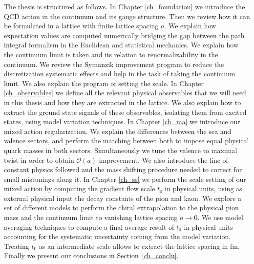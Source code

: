 The thesis is structured as follows. In Chapter \ref{ch_foundation} we introduce the QCD action in the continuum and its gauge structure. Then we review how it can be formulated in a lattice with finite lattice spacing $a$. We explain how expectation values are computed numerically bridging the gap between the path integral formalism in the Euclidean and statistical mechanics. We explain how the continuum limit is taken and its relation to renormalizability in the continuum. We review the Symanzik improvement program to reduce the discretization systematic effects and help in the task of taking the continuum limit. We also explain the program of setting the scale. In Chapter \ref{ch_observables} we define all the relevant physical observables that we will need in this thesis and how they are extracted in the lattice. We also explain how to extract the ground state signals of these observables, isolating them from excited states, using model variation techniques. In Chapter \ref{ch_ma} we introduce our mixed action regularization. We explain the differences between the sea and valence sectors, and perform the matching between both to impose equal physical quark masses in both sectors. Simultaneously we tune the valence to maximal twist in order to obtain $\mathcal{O}(a)$ improvement. We also introduce the line of constant physics followed and the mass shifting procedure needed to correct for small mistunings along it. In Chapter \ref{ch_ss} we perform the scale setting of our mixed action by computing the gradient flow scale $t_0$ in physical units, using as external physical input the decay constants of the pion and kaon. We explore a set of different models to perform the chiral extrapolation to the physical pion mass and the continuum limit to vanishing lattice spacing $a\to0$. We use model averaging techniques to compute a final average result of $t_0$ in physical units accounting for the systematic uncertainty coming from the model variation. Treating $t_0$ as an intermediate scale allows to extract the lattice spacing in fm. Finally we present our conclusions in Section~\ref{ch_conclu}.


